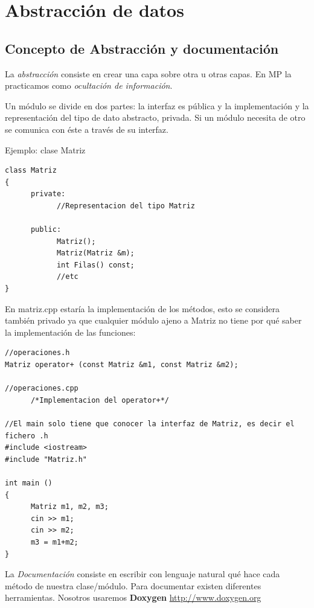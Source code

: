 \documentclass[10pt,a4paper,spanish]{report}
\begin{document}
\chapter{\textcolor[rgb]{0.8,0.2,0.2}{Abstracción de datos}}
\section{\textcolor[rgb]{0.8,0.2,0.2}Concepto de Abstracción y documentación}
\noindent
La \textit{\textcolor[rgb]{0.8,0.2,0.2}{abstracción}} consiste en crear una capa sobre otra u otras capas. En MP la practicamos como \textit{\textcolor[rgb]{0.8,0.2,0.2}{ocultación de información}}.

\noindent
Un módulo se divide en dos partes: la interfaz es pública y la implementación y la representación del tipo de dato abstracto, privada. Si un módulo necesita de otro se comunica con éste a través de su interfaz.

\noindent
Ejemplo: clase Matriz
\begin{verbatim}
class Matriz
{
      private:
            //Representacion del tipo Matriz

      public:
            Matriz();
            Matriz(Matriz &m);
            int Filas() const;
            //etc
}
\end{verbatim}
\noindent
En matriz.cpp estaría la implementación de los métodos, esto se considera también privado ya que cualquier módulo ajeno a Matriz no tiene por qué saber la implementación de las funciones:

\begin{verbatim}
//operaciones.h
Matriz operator+ (const Matriz &m1, const Matriz &m2);

//operaciones.cpp
      /*Implementacion del operator+*/

//El main solo tiene que conocer la interfaz de Matriz, es decir el fichero .h
#include <iostream>
#include "Matriz.h"

int main ()
{
      Matriz m1, m2, m3;
      cin >> m1;
      cin >> m2;
      m3 = m1+m2;
}
\end{verbatim}

\noindent
La \textit{\textcolor[rgb]{0.8,0.2,0.2}{Documentación}} consiste en escribir con lenguaje natural qué hace cada método de nuestra clase/módulo. 
Para documentar existen diferentes herramientas. Nosotros  usaremos  \textbf{\textcolor[rgb]{0.8,0.2,0.2}{Doxygen}} \url{http://www.doxygen.org}
\end{document}
